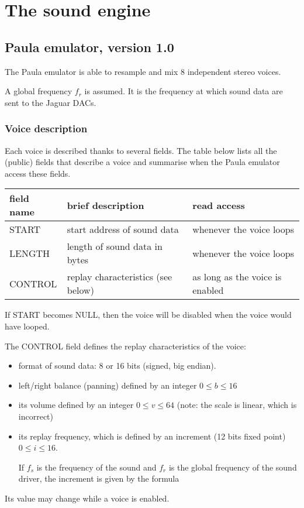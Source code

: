 \chapter{The sound engine}

\newcommand{\fname}[1]{\textsc{#1}}

\section{Paula emulator, version 1.0}
The Paula emulator is able to resample and mix 8 independent stereo
voices.

A global frequency $f_r$ is assumed. It is the frequency at which
sound data are sent to the Jaguar DACs.

\subsection{Voice description}
Each voice is described thanks to several fields. The table below
lists all the (public) fields that describe a voice and summarise when
the Paula emulator access these fields.

\begin{center}
  \begin{tabular}{|l|l|l|}
    \hline
    field name & brief description & read access \\
    \hline
    \fname{START} & start address of sound data & whenever the voice loops\\
    \fname{LENGTH} & length of sound data in bytes & whenever the
    voice loops\\
    \fname{CONTROL} & replay characteristics (see below) & as long as
    the voice is enabled\\
    \hline
  \end{tabular}
\end{center}

If \fname{START} becomes NULL, then the voice will be disabled when
the voice would have looped.

The \fname{CONTROL} field defines the replay characteristics of the
voice:
\begin{itemize}
\item format of sound data: 8 or 16 bits (signed, big endian).
\item left/right balance (panning) defined by an integer $0 \leq b
  \leq 16$
\item its volume defined by an integer $0 \leq v \leq 64$ 
  (note: the scale is linear, which is incorrect)
\item its replay frequency, which is defined by an increment (12 bits
  fixed point) $0 \leq i \leq 16$.

  If $f_s$ is the frequency of the sound and $f_r$ is the global
  frequency of the sound driver, the increment is given by
  the formula
  \begin{center}
  \end{center}
\end{itemize}
Its value may change while a voice is enabled.

